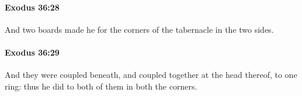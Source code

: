 		\paragraph{Exodus 36:28} %
			\label{EXODUS-36-28}

			And two boards made he for the corners of the tabernacle in the two sides.


		\paragraph{Exodus 36:29} %
			\label{EXODUS-36-29}

			And they were coupled beneath, and coupled together at the head thereof, to one ring: thus he did to both of them in both the corners.


